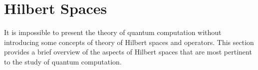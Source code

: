 \section{Hilbert Spaces} \label{sec:linalg}



It is impossible to present the theory of quantum computation without introducing some concepts of theory of Hilbert spaces and operators. This section provides a brief overview of the aspects of Hilbert spaces that are most pertinent to the study of quantum computation. 

\begin{center}
\end{center}







